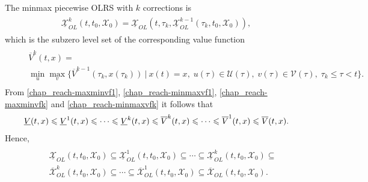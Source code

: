 \documentclass[letterpaper,10pt,english]{sphinxmanual}
\begin{document}
The minmax piecewise OLRS with $k$ corrections is
\label{chap_reach:equation-minmaxk}\begin{gather}
\begin{split}\underline{{\mathcal X}}_{OL}^k(t, t_0, {\mathcal X}_0) =
\underline{{\mathcal X}}_{OL}(t, \tau_k, \underline{{\mathcal X}}_{OL}^{k-1}(\tau_k, t_0, {\mathcal X}_0)),\end{split}\label{chap_reach-minmaxk}
\end{gather}
which is the subzero level set of the corresponding value function
\label{chap_reach:equation-minmaxvfk}\begin{gather}
\begin{split}\begin{aligned}
&&\overline{V}^k(t, x) = \nonumber \\
&&\min_u\max_v\{\overline{V}^{k-1}(\tau_k, x(\tau_k)) ~|~ x(t)=x, \;
u(\tau)\in{\mathcal U}(\tau), \; v(\tau)\in{\mathcal V}(\tau), \; \tau_k\leqslant\tau<t\}.
\end{aligned}\end{split}\label{chap_reach-minmaxvfk}
\end{gather}
From \eqref{chap_reach-maxminvf1}, \eqref{chap_reach-minmaxvf1}, \eqref{chap_reach-maxminvfk} and \eqref{chap_reach-minmaxvfk} it
follows that
\begin{gather}
\begin{split}\underline{V}(t, x) \leqslant\underline{V}^1(t, x)\leqslant\cdots
\leqslant\underline{V}^k(t, x) \leqslant\overline{V}^k(t, x) \leqslant\cdots
\leqslant\overline{V}^1(t, x) \leqslant\overline{V}(t, x) .\end{split}\notag
\end{gather}
Hence,
\label{chap_reach:equation-olrsinclusion}\begin{gather}
\begin{split}\begin{aligned}
&&\underline{{\mathcal X}}_{OL}(t, t_0, {\mathcal X}_0) \subseteq \underline{{\mathcal X}}_{OL}^1(t, t_0, {\mathcal X}_0) \subseteq \cdots
\subseteq \underline{{\mathcal X}}_{OL}^k(t, t_0, {\mathcal X}_0) \subseteq \nonumber \\
&&\overline{{\mathcal X}}_{OL}^k(t, t_0, {\mathcal X}_0) \subseteq \cdots \subseteq \overline{{\mathcal X}}_{OL}^1(t, t_0, {\mathcal X}_0)
\subseteq \overline{{\mathcal X}}_{OL}(t, t_0, {\mathcal X}_0) .
\end{aligned}\end{split}\label{chap_reach-olrsinclusion}
\end{gather}
\end{document}
